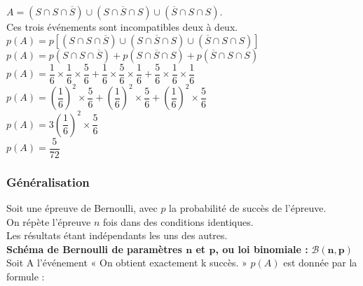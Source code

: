 $ A = \left(S \cap S \cap \overline{S} \right) \cup \left(S \cap \overline{S} \cap S \right) \cup \left(\overline{S} \cap S \cap S\right)$. \\

Ces trois événements sont incompatibles deux à deux. \\

$ p\left(A\right) = p\left[\left(S \cap S \cap \overline{S} \right) \cup \left(S \cap \overline{S} \cap S \right) \cup \left(\overline{S} \cap S \cap S\right)\right] $ \\

$ p\left(A\right) = p\left(S \cap S \cap \overline{S} \right) + p\left(S \cap \overline{S} \cap S \right) + p\left(\overline{S} \cap S \cap S\right) $ \\

$ p\left(A\right) = \dfrac{1}{6} \times \dfrac{1}{6} \times \dfrac{5}{6} + \dfrac{1}{6} \times \dfrac{5}{6} \times \dfrac{1}{6} + \dfrac{5}{6} \times \dfrac{1}{6} \times \dfrac{1}{6} $ \\

$ p\left(A\right) =  \left(\dfrac{1}{6}\right)^2 \times \dfrac{5}{6} + \left(\dfrac{1}{6}\right)^2 \times \dfrac{5}{6} + \left(\dfrac{1}{6}\right)^2 \times \dfrac{5}{6} $ \\

$p\left(A\right) = 3 \left(\dfrac{1}{6} \right)^2 \times \dfrac{5}{6} $ \\

$ p\left(A\right) = \dfrac{5}{72} $

\vspace*{-5cm}

\newpage

\subsubsection{Généralisation}

Soit une épreuve de Bernoulli, avec $p$ la probabilité de succès de l'épreuve. \\
On répète l'épreuve $n$ fois dans des conditions identiques. \\ Les résultats étant indépendants les uns des autres. \\

\textbf{Schéma de Bernoulli de paramètres $\mathbf{n}$ et $\mathbf{p}$, ou loi binomiale :} $\mathbf{\mathcal{B} \left(n,p\right)}$ \\

Soit A l'événement « On obtient exactement k succès. » $p(A)$ est donnée par la formule : \\

